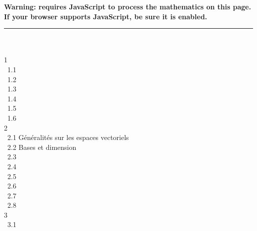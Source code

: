 \documentclass[]{article}
\author{}
\date{}
\begin{document}
\textbf{Warning: 
requires JavaScript to process the mathematics on this page.\\ If your
browser supports JavaScript, be sure it is enabled.}

\begin{center}\rule{3in}{0.4pt}\end{center}

 \\
 \\ 1
 \\ ~1.1
 \\ ~1.2
 \\ ~1.3
 \\ ~1.4
 \\ ~1.5
 \\ ~1.6
 \\ 2
 \\ ~2.1
{Généralités sur les espaces
vectoriels} \\ ~2.2 {Bases et
dimension} \\ ~2.3  \\ ~2.4
 \\
~2.5  \\
~2.6  \\ ~2.7
 \\ ~2.8
 \\ 3
 \\ ~3.1
\end{document}

